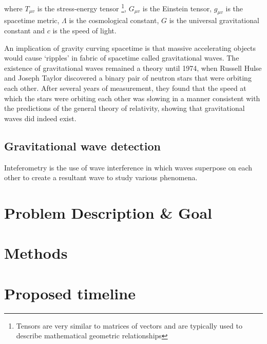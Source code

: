 \documentclass{article}
\begin{document}
where \(T_{\mu{}v}\) is the stress-energy tensor \footnote{Tensors are very similar to matrices of vectors and are typically used to describe mathematical geometric relationships}, \(G_{\mu{}v}\) is the Einstein tensor, \(g_{\mu{}v}\) is the spacetime metric, \(\Lambda\) is the cosmological constant, \(G\) is the universal gravitational constant and \(c\) is the speed of light.

An implication of gravity curving spacetime is that massive accelerating objects would cause `ripples' in fabric of spacetime called gravitational waves. The existence of gravitational waves remained a theory until 1974, when Russell Hulse and Joseph Taylor discovered a binary pair of neutron stars that were orbiting each other. After several years of measurement, they found that the speed at which the stars were orbiting each other was slowing in a manner consistent with the predictions of the general theory of relativity, showing that gravitational waves did indeed exist.

\subsection{Gravitational wave detection}

Inteferometry is the use of wave interference \textemdash{} in which waves superpose on each other to create a resultant wave \textemdash{} to study various phenomena.

\section{Problem Description \& Goal}
\section{Methods}
\section{Proposed timeline}
\end{document}
